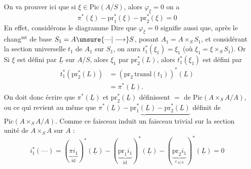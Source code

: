  On va prouver ici que si $\xi\in\mathrm{Pic}(A/S)$, alors $\varphi_\xi=0$  on a
\[
\pi^*(\xi)-\mathrm{pr}_1^*(\xi)-\mathrm{pr}_2^*(\xi)=0
\]
En effet, considérons le diagramme
Dire que $\varphi_\xi=0$ signifie aussi que, après le chang$^{\mathrm{mt}}$ de base   $S_1=A\unsure{\text{---}|\longrightarrow} S$, posant $A_1=A\times_S S_1$, et considérant la section universelle $t_1$ de $A_1$ sur $S_1$, on aura $t_1^*(\xi_1)=\xi_1$ (où $\xi_1=\xi\times_S S_1$).
Or  Si $\xi$ est défini par $\underline L$ sur $A/S$,  alors $\xi_1$ par $\mathrm{pr}_2^*(L)$, alors $t_1^*(\xi_1)$ est défini par
\[
\begin{aligned}
t_1^*(\mathrm{pr}_2^*(L))&=(\mathrm{pr}_2\,\mathrm{transl}(t_1))^*(\underline L)\\
&=\pi^*(\underline L).
\end{aligned}
\]
On doit donc  écrire que $\pi^*(\underline L)$ et $\mathrm{pr}_2^*(\underline L)$ définissent  $=$  de $\mathrm{Pic}(A\times_S A/A)$, ou ce qui revient au même que
$\underbrace{\pi^*(\underline L)-\mathrm{pr}_1^*(\underline L)-\mathrm{pr}_2^*(\underline L)}$ définit   \uline{} de $\mathrm{Pic}(A\times_S A/A)$. Comme ce faisceau induit un faisceau trivial sur la section unité de $A\times_S A$ sur $A$ :
\[
i_1^*(\text{---})=(\underbrace{\pi i_1}_{\mathrm{id}})^*(\underline L)-(\underbrace{\mathrm{pr}_1 i_1}_{\mathrm{id}})^*(\underline L)-(\underbrace{\mathrm{pr}_2 i_1}_{\varepsilon_{A/S}})^*(\underline L)=0
\]

